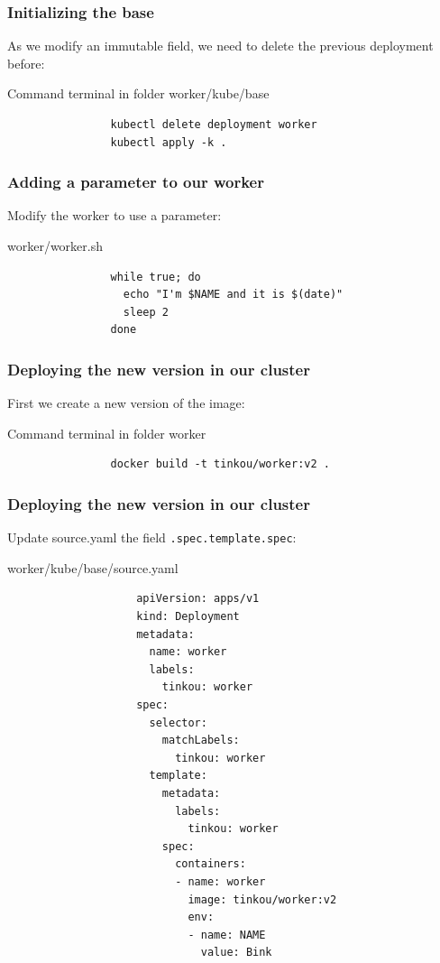	\begin{frame}[fragile]
		\frametitle{Initializing the base}
		As we modify an immutable field, we need to delete the previous deployment before:
		\begin{block}{Command terminal in folder worker/kube/base}
			\begin{verbatim}
				kubectl delete deployment worker
				kubectl apply -k .
			\end{verbatim}
		\end{block}
	\end{frame}
	
	\begin{frame}[fragile]
		\frametitle{Adding a parameter to our worker}
		
		Modify the worker to use a parameter:
		\begin{block}{worker/worker.sh}
			\begin{verbatim}
				while true; do
				  echo "I'm $NAME and it is $(date)"
				  sleep 2
				done
			\end{verbatim}
		\end{block}
	\end{frame}
	
	\begin{frame}[fragile]
		\frametitle{Deploying the new version in our cluster}
		
		First we create a new version of the image:
		\begin{block}{Command terminal in folder worker}
			\begin{verbatim}
				docker build -t tinkou/worker:v2 .
			\end{verbatim}
		\end{block}
	\end{frame}
	
	\begin{frame}[fragile]
		\frametitle{Deploying the new version in our cluster}
		
		Update source.yaml the field \verb!.spec.template.spec!:
		\begin{block}{worker/kube/base/source.yaml}
			\begin{tiny}
				\begin{verbatim}
					apiVersion: apps/v1
					kind: Deployment
					metadata:
					  name: worker
					  labels:
					    tinkou: worker
					spec:
					  selector:
					    matchLabels:
					      tinkou: worker
					  template:
					    metadata:
					      labels:
					        tinkou: worker
					    spec:
					      containers:
					      - name: worker
					        image: tinkou/worker:v2
					        env:
					        - name: NAME
					          value: Bink
				\end{verbatim}
			\end{tiny}
		\end{block}
	\end{frame}
	
